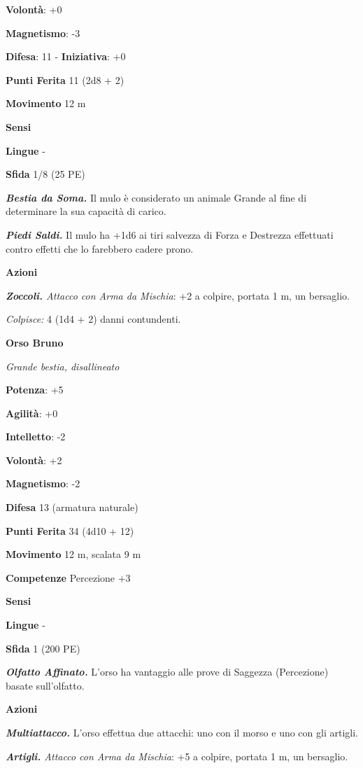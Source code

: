 \begin{multicols}{2}
\textbf{Volontà}: +0

\textbf{Magnetismo}: -3

\textbf{Difesa}: 11 - \textbf{Iniziativa}: +0

\textbf{Punti Ferita} 11 (2d8 + 2)

\textbf{Movimento} 12 m

\textbf{Sensi} 

\textbf{Lingue} -

\textbf{Sfida} 1/8 (25 PE)\smallskip

\emph{\textbf{Bestia da Soma.}} Il mulo è considerato un animale Grande
al fine di determinare la sua capacità di carico.

\emph{\textbf{Piedi Saldi.}} Il mulo ha +1d6 ai tiri salvezza di
Forza e Destrezza effettuati contro effetti che lo farebbero cadere
prono.

\smallskip\textbf{Azioni}

\emph{\textbf{Zoccoli.} Attacco con Arma da Mischia}: +2 a colpire,
portata 1 m, un bersaglio.

\emph{Colpisce:} 4 (1d4 + 2) danni contundenti.

\textbf{Orso Bruno}

\emph{Grande bestia, disallineato}

\textbf{Potenza}: +5

\textbf{Agilità}: +0

\textbf{Intelletto}: -2

\textbf{Volontà}: +2

\textbf{Magnetismo}: -2

\textbf{Difesa} 13 (armatura naturale)

\textbf{Punti Ferita} 34 (4d10 + 12)

\textbf{Movimento} 12 m, scalata 9 m

\textbf{Competenze} Percezione +3

\textbf{Sensi} 

\textbf{Lingue} -

\textbf{Sfida} 1 (200 PE)\smallskip

\emph{\textbf{Olfatto Affinato.}} L'orso ha vantaggio alle prove di
Saggezza (Percezione) basate sull'olfatto.

\smallskip\textbf{Azioni}

\emph{\textbf{Multiattacco.}} L'orso effettua due attacchi: uno con il
morso e uno con gli artigli.

\emph{\textbf{Artigli.} Attacco con Arma da Mischia}: +5 a colpire,
portata 1 m, un bersaglio.


\end{multicols}

